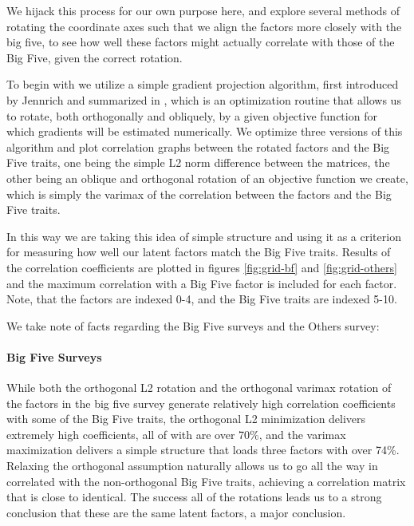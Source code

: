 \documentclass[a4paper,12pt]{article}
\begin{document}
We hijack this process for our own purpose here, and explore several methods of rotating the coordinate axes such that we align the factors more closely with the big five, to see how well these factors might actually correlate with those of the Big Five, given the correct rotation.

To begin with we utilize a simple gradient projection algorithm, first introduced by Jennrich and summarized in \cite{2005gradient}, which is an optimization routine that allows us to rotate, both orthogonally and obliquely, by a given objective function for which gradients will be estimated numerically. We optimize three versions of this algorithm and plot correlation graphs between the rotated factors and the Big Five traits, one being the simple L2 norm difference between the matrices, the other being an oblique and orthogonal rotation of an objective function we create, which is simply the varimax of the correlation between the factors and the Big Five traits.

In this way we are taking this idea of simple structure and using it as a criterion for measuring how well our latent factors match the Big Five traits. Results of the correlation coefficients are plotted in figures \ref{fig:grid-bf} and \ref{fig:grid-others} and the maximum correlation with a Big Five factor is included for each factor. Note, that the factors are indexed 0-4, and the Big Five traits are indexed 5-10.

We take note of facts regarding the Big Five surveys and the Others survey:

\paragraph{Big Five Surveys}
While both the orthogonal L2 rotation and the orthogonal varimax rotation of the factors in the big five survey generate relatively high correlation coefficients with some of the Big Five traits, the orthogonal L2 minimization delivers extremely high coefficients, all of with are over 70\%, and the varimax maximization delivers a simple structure that loads three factors with over 74\%. Relaxing the orthogonal assumption naturally allows us to go all the way in correlated with the non-orthogonal Big Five traits, achieving a correlation matrix that is close to identical. The success all of the rotations leads us to a strong conclusion that these are the same latent factors, a major conclusion.
\end{document}
